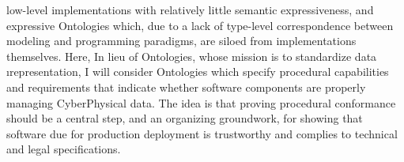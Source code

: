 {low-level implementations with relatively little 
semantic expressiveness, and expressive 
Ontologies which, due to a lack of type-level 
correspondence between modeling and programming 
paradigms, are siloed from implementations themselves.   
Here, In lieu of  
Ontologies, whose mission is to standardize data 
\i{representation}, I will consider  
Ontologies which specify procedural capabilities and 
requirements that indicate whether software components 
are properly managing CyberPhysical data.  The 
idea is that proving procedural conformance should be a 
central step, and an organizing groundwork, for 
showing that software due for production deployment 
is trustworthy and complies to technical and legal specifications.
}
